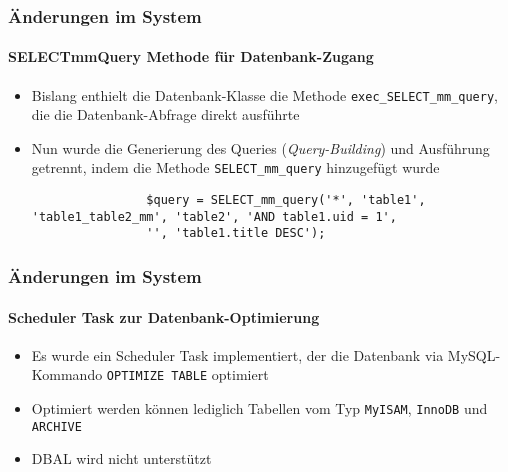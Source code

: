 
\begin{frame}[fragile]
	\frametitle{Änderungen im System}
	\framesubtitle{SELECTmmQuery Methode für Datenbank-Zugang}

	\lstset{basicstyle=\tiny\ttfamily}

	\begin{itemize}

		\item Bislang enthielt die Datenbank-Klasse die Methode \texttt{exec\_SELECT\_mm\_query},
			die die Datenbank-Abfrage direkt ausführte

		\item Nun wurde die Generierung des Queries (\textit{Query-Building}) und Ausführung getrennt,
			indem die Methode \texttt{SELECT\_mm\_query} hinzugefügt wurde

			\begin{lstlisting}
				$query = SELECT_mm_query('*', 'table1', 'table1_table2_mm', 'table2', 'AND table1.uid = 1',
				'', 'table1.title DESC');
			\end{lstlisting}

	\end{itemize}

\end{frame}


\begin{frame}[fragile]
	\frametitle{Änderungen im System}
	\framesubtitle{Scheduler Task zur Datenbank-Optimierung}

	\begin{itemize}

		\item Es wurde ein Scheduler Task implementiert, der die Datenbank via MySQL-Kommando
			\texttt{OPTIMIZE TABLE} optimiert

		\item Optimiert werden können lediglich Tabellen vom Typ\newline
			\texttt{MyISAM}, \texttt{InnoDB} und \texttt{ARCHIVE}

		\item DBAL wird nicht unterstützt

	\end{itemize}

\end{frame}

